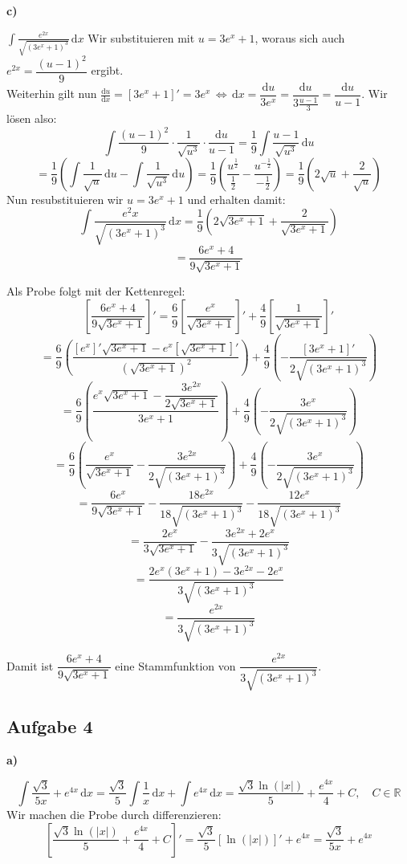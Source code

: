 \documentclass[a4paper,graphics,11pt]{article}
\newcommand{\aufgabe}[1]{\subsection*{Aufgabe #1}}
\begin{document}
\textbf{c)}

$
    \displaystyle\int \frac{e^{2x}}{\sqrt{(3e^x+1)^3}}\, \mathrm{d}x
$
\quad Wir substituieren mit $u = 3e^x+1$, woraus sich auch $e^{2x} = \dfrac{(u-1)^2}{9}$ ergibt.\\[5pt]
Weiterhin gilt nun
$\frac{\mathrm{d}u}{\mathrm{d}x}
= [3e^x+1]'
= 3e^x \,\Longleftrightarrow\, \mathrm{d}x
= \dfrac{\mathrm{d}u}{3e^x}
= \dfrac{\mathrm{d}u}{3\frac{u-1}{3}}
= \dfrac{\mathrm{d}u}{u-1}
$. Wir lösen also:
$$
    \int \frac{(u-1)^2}{9} \cdot \frac{1}{\sqrt{u^3}}\cdot \frac{\mathrm{d}u}{u-1}
    = \frac{1}{9}\int \frac{u-1}{\sqrt{u^3}}\, \mathrm{d}u
$$$$
    = \frac{1}{9}\left(\int \frac{1}{\sqrt{u}}\, \mathrm{d}u - \int \frac{1}{\sqrt{u^3}}\, \mathrm{d}u\right)
    = \frac{1}{9}\left(\frac{u^{\frac{1}{2}}}{\frac{1}{2}} - \frac{u^{-\frac{1}{2}}}{-\frac{1}{2}}\right)
    = \frac{1}{9}\left(2\sqrt{u} + \frac{2}{\sqrt{u}}\right)
$$
Nun resubstituieren wir $u = 3e^x+1$ und erhalten damit:
$$
    \int \frac{e^2x}{\sqrt{(3e^x+1)^3}}\,\mathrm{d}x = \frac{1}{9}\left(2\sqrt{3e^x+1} + \frac{2}{\sqrt{3e^x+1}}\right)
$$$$
    = \frac{6e^x+4}{9\sqrt{3e^x+1}}
$$

Als Probe folgt mit der Kettenregel:
$$
    \left[\frac{6e^x+4}{9\sqrt{3e^x+1}}\right]'
    = \frac{6}{9}\left[\frac{e^x}{\sqrt{3e^x+1}}\right]' + \frac{4}{9}\left[\frac{1}{\sqrt{3e^x+1}}\right]'
$$$$
    = \frac{6}{9}\left(\frac{[e^x]'\sqrt{3e^x+1} -e^x\left[\sqrt{3e^x+1}\right]'}{\left(\sqrt{3e^x+1}\right)^2} \right)
        +\frac{4}{9}\left(-\frac{[3e^x+1]'}{2\sqrt{(3e^x+1)^3}}\right)
$$$$
    = \frac{6}{9}\left(\frac{e^x\sqrt{3e^x+1} - \dfrac{3e^{2x}}{2\sqrt{3e^x+1}}}{3e^x+1} \right)
        +\frac{4}{9}\left(-\frac{3e^x}{2\sqrt{(3e^x+1)^3}}\right)
$$$$
    = \frac{6}{9}\left(\frac{e^x}{\sqrt{3e^x+1}} - \frac{3e^{2x}}{2\sqrt{(3e^x+1)^3}}\right)
        +\frac{4}{9}\left(-\frac{3e^x}{2\sqrt{(3e^x+1)^3}}\right)
$$$$
    = \frac{6e^x}{9\sqrt{3e^x+1}} - \frac{18e^{2x}}{18\sqrt{(3e^x+1)^3}} -\frac{12e^x}{18\sqrt{(3e^x+1)^3}}
$$$$
     = \frac{2e^x}{3\sqrt{3e^x+1}} - \frac{3e^{2x}+2e^x}{3\sqrt{(3e^x+1)^3}}
$$$$
     = \frac{2e^x(3e^x+1) - 3e^{2x}-2e^x}{3\sqrt{(3e^x+1)^3}}
$$$$
    = \frac{e^{2x}}{3\sqrt{(3e^x+1)^3}}
$$

Damit ist $\dfrac{6e^x+4}{9\sqrt{3e^x+1}}$ eine Stammfunktion von $\dfrac{e^{2x}}{3\sqrt{(3e^x+1)^3}}$.

\newpage

\aufgabe{4}

\textbf{a)}

$$
    \int \frac{\sqrt{3}}{5x}+e^{4x}\, \mathrm{d}x
    = \frac{\sqrt{3}}{5}\int \frac{1}{x}\, \mathrm{d}x + \int e^{4x}\, \mathrm{d}x
    = \frac{\sqrt{3}\ln(|x|)}{5} + \frac{e^{4x}}{4} + C,\quad C \in \mathbb{R}
$$
Wir machen die Probe durch differenzieren:
$$
    \left[\frac{\sqrt{3}\ln(|x|)}{5} + \frac{e^{4x}}{4} + C\right]'
    = \frac{\sqrt{3}}{5}[\ln(|x|)]' + e^{4x}
    = \frac{\sqrt{3}}{5x} + e^{4x}
$$
\end{document}
